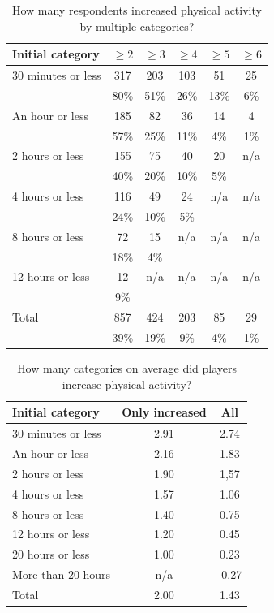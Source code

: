 \begin{table}[h]
	\centering
	\caption{How many respondents increased physical activity by multiple categories?}
	\label{tbl:physical-activity-increased-multiple-categories}
	\begin{tabular}{|l|c|c|c|c|c|}
		\hline
		\textbf{Initial category} & \textbf{\( \geq2 \)} & \textbf{\( \geq3 \)} & \textbf{\( \geq4 \)}	& \textbf{\( \geq5 \)} & \textbf{\( \geq6 \)}\\
		\hline\hline
		30 minutes or less	& 317	& 203	& 103	& 51	& 25\\
							& 80\%	& 51\%	& 26\%	& 13\%	& 6\%\\\hline
		An hour or less		& 185	& 82	& 36	& 14	& 4\\
							& 57\%	& 25\%	& 11\%	& 4\%	& 1\%\\\hline
		2 hours or less		& 155	& 75	& 40	& 20	& n/a\\
							& 40\%	& 20\%	& 10\%	& 5\%	&\\\hline
		4 hours or less		& 116	& 49	& 24	& n/a	& n/a\\
							& 24\%	& 10\%	& 5\%	&		&\\\hline
		8 hours or less		& 72	& 15	& n/a	& n/a	& n/a\\
							& 18\%	& 4\%	& 		&		&\\\hline
		12 hours or less	& 12	& n/a	& n/a	& n/a	& n/a\\
							& 9\%	& 		&		&		&\\\hline
		\hline
		Total				& 857	& 424	& 203	& 85	& 29\\
							& 39\%	& 19\%	& 9\%	& 4\%	& 1\%\\\hline
	\end{tabular}
\end{table}

\begin{table}[h]
	\centering
	\caption{How many categories on average did players increase physical activity?}
	\label{tbl:physical-activity-average-categories-increased}
	\begin{tabular}{|l|c|c|}
		\hline
		\textbf{Initial category} & \textbf{Only increased} & \textbf{All}\\
		\hline\hline
		30 minutes or less	& 2.91	& 2.74\\
		An hour or less		& 2.16	& 1.83\\
		2 hours or less		& 1.90	& 1,57\\
		4 hours or less		& 1.57	& 1.06\\
		8 hours or less		& 1.40	& 0.75\\
		12 hours or less	& 1.20	& 0.45\\
		20 hours or less	& 1.00	& 0.23\\
		More than 20 hours	& n/a	& -0.27\\
		\hline
		Total				& 2.00	& 1.43\\\hline
	\end{tabular}
\end{table}

